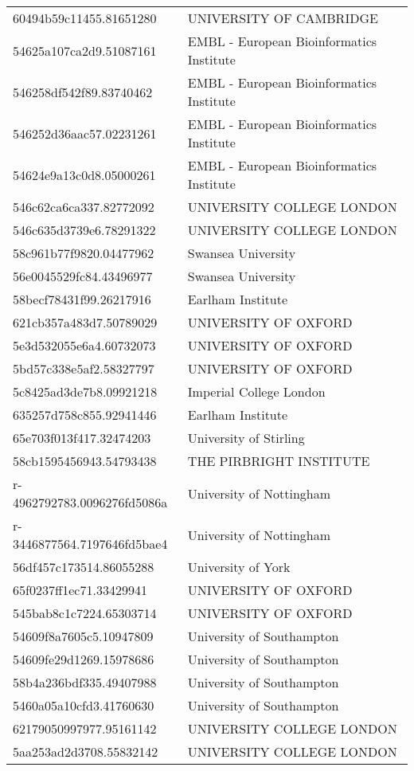 \begin{tabular}{ll}
60494b59c11455.81651280 & UNIVERSITY OF CAMBRIDGE \\
54625a107ca2d9.51087161 & EMBL - European Bioinformatics Institute \\
546258df542f89.83740462 & EMBL - European Bioinformatics Institute \\
546252d36aac57.02231261 & EMBL - European Bioinformatics Institute \\
54624e9a13c0d8.05000261 & EMBL - European Bioinformatics Institute \\
546c62ca6ca337.82772092 & UNIVERSITY COLLEGE LONDON \\
546c635d3739e6.78291322 & UNIVERSITY COLLEGE LONDON \\
58c961b77f9820.04477962 & Swansea University \\
56e0045529fc84.43496977 & Swansea University \\
58becf78431f99.26217916 & Earlham Institute \\
621cb357a483d7.50789029 & UNIVERSITY OF OXFORD \\
5e3d532055e6a4.60732073 & UNIVERSITY OF OXFORD \\
5bd57c338e5af2.58327797 & UNIVERSITY OF OXFORD \\
5c8425ad3de7b8.09921218 & Imperial College London \\
635257d758c855.92941446 & Earlham Institute \\
65e703f013f417.32474203 & University of Stirling \\
58cb1595456943.54793438 & THE PIRBRIGHT INSTITUTE \\
r-4962792783.0096276fd5086a & University of Nottingham \\
r-3446877564.7197646fd5bae4 & University of Nottingham \\
56df457c173514.86055288 & University of York \\
65f0237ff1ec71.33429941 & UNIVERSITY OF OXFORD \\
545bab8c1c7224.65303714 & UNIVERSITY OF OXFORD \\
54609f8a7605c5.10947809 & University of Southampton \\
54609fe29d1269.15978686 & University of Southampton \\
58b4a236bdf335.49407988 & University of Southampton \\
5460a05a10cfd3.41760630 & University of Southampton \\
62179050997977.95161142 & UNIVERSITY COLLEGE LONDON \\
5aa253ad2d3708.55832142 & UNIVERSITY COLLEGE LONDON \\

\end{tabular}
